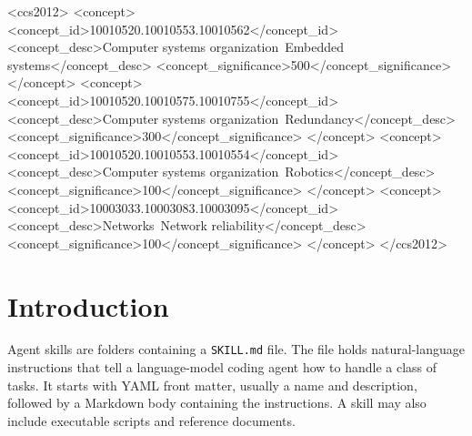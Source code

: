 \documentclass[sigconf,review]{acmart}
\begin{document}
\begin{CCSXML}
<ccs2012>
 <concept>
  <concept_id>10010520.10010553.10010562</concept_id>
  <concept_desc>Computer systems organization~Embedded systems</concept_desc>
  <concept_significance>500</concept_significance>
 </concept>
 <concept>
  <concept_id>10010520.10010575.10010755</concept_id>
  <concept_desc>Computer systems organization~Redundancy</concept_desc>
  <concept_significance>300</concept_significance>
 </concept>
 <concept>
  <concept_id>10010520.10010553.10010554</concept_id>
  <concept_desc>Computer systems organization~Robotics</concept_desc>
  <concept_significance>100</concept_significance>
 </concept>
 <concept>
  <concept_id>10003033.10003083.10003095</concept_id>
  <concept_desc>Networks~Network reliability</concept_desc>
  <concept_significance>100</concept_significance>
 </concept>
</ccs2012>
\end{CCSXML}




\maketitle

\section{Introduction}
\label{Section:Introduction}

Agent skills are folders containing a \texttt{SKILL.md} file. The file holds natural-language instructions that tell a language-model coding agent how to handle a class of tasks. It starts with YAML front matter, usually a name and description, followed by a Markdown body containing the instructions. A skill may also include executable scripts and reference documents.
\end{document}

